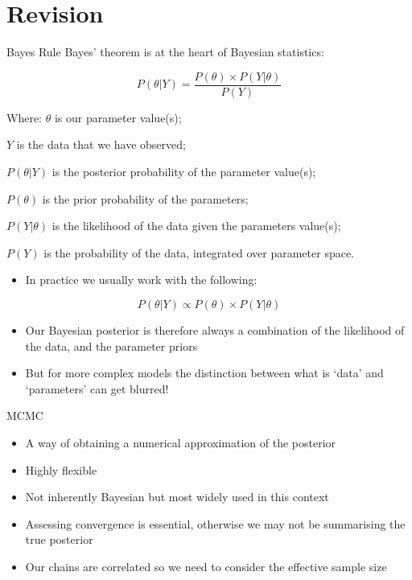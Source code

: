 \documentclass[
  ignorenonframetext,
  aspectratio=169,
]{beamer}
\providecommand{\tightlist}{%
  \setlength{\itemsep}{0pt}\setlength{\parskip}{0pt}}
\begin{document}
\hypertarget{revision}{%
\section{Revision}\label{revision}}

\begin{frame}{Bayes Rule}
\protect\hypertarget{bayes-rule}{}
Bayes' theorem is at the heart of Bayesian statistics:

\[P(\theta|Y) = \frac{P(\theta)\times P(Y|\theta)}{P(Y)}\]

\pause

Where: \(\theta\) is our parameter value(s);

\(Y\) is the data that we have observed;

\(P(\theta|Y)\) is the posterior probability of the parameter value(s);

\(P(\theta)\) is the prior probability of the parameters;

\(P(Y|\theta)\) is the likelihood of the data given the parameters
value(s);

\(P(Y)\) is the probability of the data, integrated over parameter
space.
\end{frame}

\begin{frame}
\begin{itemize}
\tightlist
\item
  In practice we usually work with the following:
\end{itemize}

\[P(\theta|Y) \propto P(\theta)\times P(Y|\theta)\]

\pause

\begin{itemize}
\item
  Our Bayesian posterior is therefore always a combination of the
  likelihood of the data, and the parameter priors
\item
  But for more complex models the distinction between what is `data' and
  `parameters' can get blurred!
\end{itemize}
\end{frame}

\begin{frame}{MCMC}
\protect\hypertarget{mcmc}{}
\begin{itemize}
\item
  A way of obtaining a numerical approximation of the posterior
\item
  Highly flexible
\item
  Not inherently Bayesian but most widely used in this context
\item
  Assessing convergence is essential, otherwise we may not be
  summarising the true posterior
\item
  Our chains are correlated so we need to consider the effective sample
  size
\end{itemize}
\end{frame}
\end{document}
